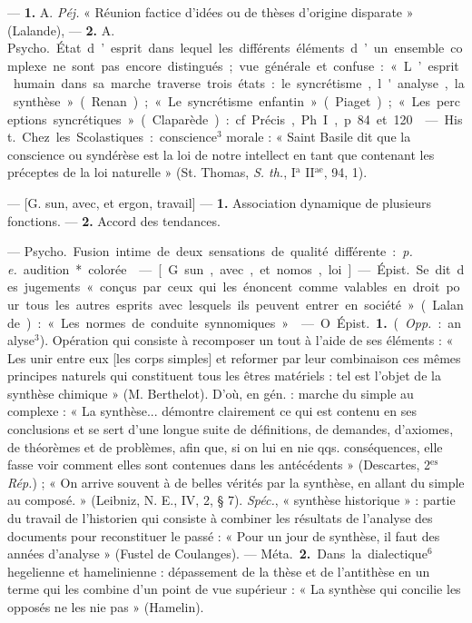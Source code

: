 \begin{itemize}[leftmargin=1cm, label=, itemsep=1pt]
 — {\bf 1.} A. {\it Péj.} « Réunion
factice d’idées ou de thèses d’origine
disparate » (Lalande), — {\bf 2.} A.
\si{Psycho.} État d’esprit dans lequel
les différents éléments d’un ensemble complexe ne sont pas encore
distingués; vue générale et confuse :
« L’esprit humain dans sa marche
traverse trois états : le syncrétisme,
l'analyse, la synthèse » (Renan) ;
« Le syncrétisme enfantin » (Piaget) ;
« Les perceptions syncrétiques »
(Claparède) : cf. Précis, Ph. I, p. 84
et 120.

 — \si{Hist.} Chez les Scolastiques : conscience$^3$ morale : « Saint
Basile dit que la conscience ou syndérèse est la loi de notre intellect en
tant que contenant les préceptes de
la loi naturelle » (St. Thomas, {\it S. th.},
I$^\text{a}$ II$^\text{ae}$, 94, 1).

 — [G. sun, avec, et ergon, travail] — {\bf 1.} Association dynamique
de plusieurs fonctions. — {\bf 2.} Accord
des tendances.

 — \si{Psycho.} Fusion intime
de deux sensations de qualité différente : {\it p. e.} audition* colorée.

 — [G. sun, avec, et nomos,
loi] — \si{Épist.} Se dit des jugements
« conçus par ceux qui les énoncent
comme valables en droit pour tous
les autres esprits avec lesquels ils
peuvent entrer en société » (Lalande) : « Les normes de conduite
synnomiques. »

 — O. \si{Épist.} {\bf 1.} ({\it Opp.} : analyse$^3$). Opération qui consiste à recomposer un tout à l’aide de ses
éléments : « Les unir entre eux [les
corps simples] et reformer par leur
combinaison ces mêmes principes
naturels qui constituent tous les
êtres matériels : tel est l’objet de la
synthèse chimique » (M. Berthelot).
D'où, en gén. : marche du simple au
complexe : « La synthèse... démontre
clairement ce qui est contenu en ses
conclusions et se sert d’une longue
suite de définitions, de demandes,
d’axiomes, de théorèmes et de
problèmes, afin que, si on lui en
nie qqs. conséquences, elle fasse
voir comment elles sont contenues
dans les antécédents » (Descartes,
2$^\text{es}$ {\it Rép.}) ; « On arrive souvent à de
belles vérités par la synthèse, en
allant du simple au composé. »
(Leibniz, N. E., IV, 2, § 7). {\it Spéc.},
« synthèse historique » : partie du
travail de l’historien qui consiste à
combiner les résultats de l’analyse
des documents pour reconstituer le
passé : « Pour un jour de synthèse,
il faut des années d'analyse » (Fustel
de Coulanges). — \si{Méta.} {\bf 2.} Dans la
dialectique$^6$ hegelienne et hamelinienne : dépassement de la thèse et
de l’antithèse en un terme qui les
combine d’un point de vue supérieur : « La synthèse qui concilie les
opposés ne les nie pas » (Hamelin).


\end{itemize}
